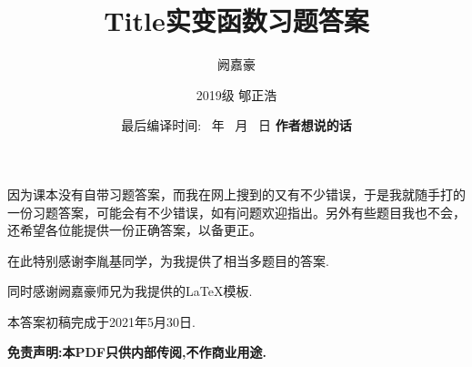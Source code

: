 \documentclass[UTF8, a4paper, 12pt, oneside, onecolumn]{article}
\title{\zihao{0}\mdseries\heiti Title}
\author{\zihao{-0}\mdseries\kaishu 阙嘉豪}
\date{\zihao{1}\mdseries 最后编译时间: \number\year ~年 \number\month ~月 \number\day ~日 \currenttime}
\newcommand{\erhao}{\fontsize{22.1pt}{\baselineskip}\selectfont}
\numberwithin{equation}{section}
\numberwithin{figure}{section}
\numberwithin{table}{section}
\theoremstyle{nonumberplain}	%
\theoremstyle{plain}	%
\theoremstyle{plain}	%
\theoremstyle{plain}	%
\theoremstyle{plain}	%
\theoremstyle{nonumberplain}
\begin{document}
\title {\erhao \bf 实变函数习题答案}
\author{2019级 郇正浩}
\date{\bf 作者想说的话}


\maketitle
因为课本没有自带习题答案，而我在网上搜到的又有不少错误，于是我就随手打的一份习题答案，可能会有不少错误，如有问题欢迎指出。另外有些题目我也不会，还希望各位能提供一份正确答案，以备更正。

在此特别感谢李胤基同学，为我提供了相当多题目的答案.

同时感谢阙嘉豪师兄为我提供的\LaTeX 模板.

本答案初稿完成于2021年5月30日.

{\bf 免责声明:本PDF只供内部传阅,不作商业用途.}



\newpage
\tableofcontents
\newpage
\end{document}
